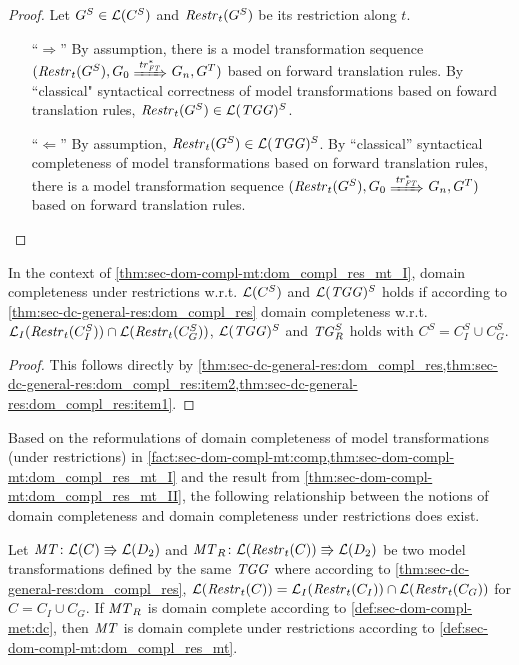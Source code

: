 \begin{proof}
Let $G^S \in \mathcal{L}(C^S)$ and $\mathit{Restr}_t(G^S)$ be its restriction along $t$.
\begin{enumerate}
  \item [``$\Rightarrow$''] By assumption, there is a model transformation sequence $(\Restr_t(G^S),G_0 \Trans{\tr^*_\FT} G_n,G^T)$ based on forward translation rules.
  By ``classical" syntactical correctness of model transformations based on foward translation rules, $\mathit{Restr}_t(G^S) \in \mathcal{L}(\mathit{TGG})^S$.
  \item [``$\Leftarrow$''] By assumption, $\mathit{Restr}_t(G^S) \in \mathcal{L}(\mathit{TGG})^S$.
  By ``classical'' syntactical completeness of model transformations based on forward translation rules, there is a model transformation sequence $(\Restr_t(G^S),G_0 \Trans{\tr^*_\FT} G_n,G^T)$ based on forward translation rules.
\end{enumerate}
\end{proof}

\begin{corollary}
\label{thm:sec-dom-compl-mt:dom_compl_res_mt_II}
In the context of \cref{thm:sec-dom-compl-mt:dom_compl_res_mt_I}, domain completeness under restrictions w.r.t. $\mathcal{L}(C^S)$ and $\mathcal{L}(\mathit{TGG})^S$ holds if according to \cref{thm:sec-dc-general-res:dom_compl_res} domain completeness w.r.t. $\mathcal{L}_I(\mathit{Restr}_t(C^S_I)) \cap \mathcal{L}(\mathit{Restr}_t(C^S_G))$, $\mathcal{L}(\mathit{TGG})^S$ and $\mathit{TG}^S_R$ holds with $C^S=C^S_I \cup C^S_G$.
\envEndMarker
\end{corollary}

\begin{proof}
This follows directly by \cref{thm:sec-dc-general-res:dom_compl_res,thm:sec-dc-general-res:dom_compl_res:item2,thm:sec-dc-general-res:dom_compl_res:item1}.
\end{proof}

Based on the reformulations of domain completeness of model transformations (under restrictions) in \cref{fact:sec-dom-compl-mt:comp,thm:sec-dom-compl-mt:dom_compl_res_mt_I} and the result from \cref{thm:sec-dom-compl-mt:dom_compl_res_mt_II}, the following relationship between the notions of domain completeness and domain completeness under restrictions does exist.

\begin{corollary}
\label{thm:sec-dom-compl-mt:dom_compl_res_mt_equiv}
Let $\mathit{MT}\colon \mathcal{L}(C) \Rrightarrow \mathcal{L}(D_2)$ and $\mathit{MT}_R\colon \mathcal{L}(\mathit{Restr}_t(C)) \Rrightarrow \mathcal{L}(D_2)$ be two model transformations defined by the same $\mathit{TGG}$ where according to \cref{thm:sec-dc-general-res:dom_compl_res}, $\mathcal{L}(\mathit{Restr}_t(C))=\mathcal{L}_I(\mathit{Restr}_t(C_I)) \cap \mathcal{L}(\mathit{Restr}_t(C_G))$ for $C=C_I \cup C_G$.
If $\mathit{MT}_R$ is domain complete according to \cref{def:sec-dom-compl-met:dc}, then $\mathit{MT}$ is domain complete under restrictions according to \cref{def:sec-dom-compl-mt:dom_compl_res_mt}.
\envEndMarker
\end{corollary}

